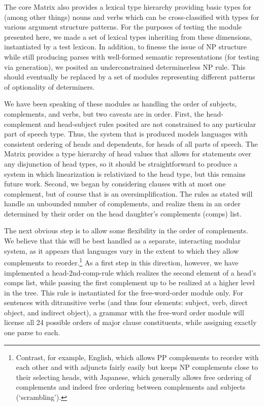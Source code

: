 \documentclass[11pt]{article}
\begin{document}
The core Matrix also provides a lexical type hierarchy providing basic
types for (among other things) nouns and verbs which can be
cross-classified with types for various argument structure patterns.
For the purposes of testing the module presented here, we made a set
of lexical types inheriting from these dimensions, instantiated by a
test lexicon.  In addition, to finesse the issue of NP structure while
still producing parses with well-formed semantic representations (for
testing via generation), we posited an underconstrained determinerless
NP rule.  This should eventually be replaced by a set of modules
representing different patterns of optionality of determiners.

We have been speaking of these modules as handling the order of
subjects, complements, and verbs, but two caveats are in order.  First,
the head-complement and head-subject rules posited are not constrained
to any particular part of speech type. Thus, the system that is
produced models languages with consistent ordering of heads and
dependents, for heads of all parts of speech.  The Matrix provides a
type hierarchy of {\sc head} values that allows for statements over any
disjunction of head types, so it should be straightforward to produce
a system in which linearization is relativized to the head type, but
this remains future work.  Second, we began by considering clauses
with at most one complement, but of course that is an
oversimplification.  The rules as stated will handle an unbounded
number of complements, and realize them in an order determined by
their order on the head daughter's complements ({\sc comps}) list.

The next obvious step is to allow some flexibility in the order of
complements.  We believe that this will be best handled as a separate,
interacting modular system, as it appears that languages vary in the
extent to which they allow complements to reorder.\footnote{Contrast,
for example, English, which allows PP complements to reorder with each
other and with adjuncts fairly easily but keeps NP complements close
to their selecting heads, with Japanese, which generally allows free
ordering of complements and indeed free ordering between complements
and subjects (`scrambling').}  As a first step in this direction,
however, we have implemented a head-2nd-comp-rule which realizes the
second element of a head's {\sc comps} list, while passing the first
complement up to be realized at a higher level in the tree.  This rule
is instantiated for the free-word-order module only.  For sentences
with ditransitive verbs (and thus four elements: subject, verb, direct
object, and indirect object), a grammar with the free-word order
module will license all 24 possible orders of major clause
constituents, while assigning exactly one parse to each.
\end{document}

